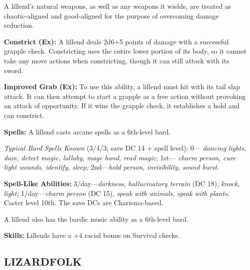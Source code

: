 \documentclass{article}
\begin{document}
A lillend's natural weapons, as well as any weapons it wields, are treated as chaotic-aligned 
and good-aligned for the purpose of overcoming damage reduction.

\textbf{Constrict (Ex):} A lillend deals 2d6+5 points of damage with a successful 
grapple check. Constricting uses the entire lower portion of its body, so it cannot 
take any move actions when constricting, though it can still attack with its sword.

\textbf{Improved Grab (Ex):} To use this ability, a lillend must hit with its tail 
slap attack. It can then attempt to start a grapple as a free action without provoking 
an attack of opportunity. If it wins the grapple check, it establishes a hold and 
can constrict. 

\textbf{Spells:} A lillend casts arcane spells as a 6th-level bard.

\textit{Typical Bard Spells Known }(3/4/3; save DC 14 + spell level): 0--- \textit{dancing 
lights, daze, detect magic, lullaby, mage hand, read magic; }1st--- \textit{charm 
person, cure light wounds, identify, sleep; }2nd---\textit{hold person, invisibility, 
sound burst.}

\textbf{Spell-Like Abilities:} 3/day---\textit{darkness, hallucinatory terrain 
}(DC 18), \textit{knock, light; }1/day---\textit{charm person }(DC 15), \textit{speak 
with animals, speak with plants}. Caster level 10th. The save DCs are Charisma-based.

A lillend also has the bardic music ability as a 6th-level bard.

\textbf{Skills:} Lillends have a +4 racial bonus on Survival checks.

\vspace{12pt}
\subsection*{{\LARGE{}LIZARDFOLK}}
\end{document}
